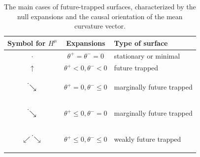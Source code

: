 \documentclass[12pt]{iopart}
\def\dotsearrow{\hspace{-4mm}\dot{\hspace{4.8mm}\searrow}}
\begin{document}
\begin{center}
\begin{table}[h]
\caption{The main cases of future-trapped surfaces, characterized by the null expansions and the causal orientation of the mean curvature vector.}
{\begin{tabular}{c|c|l}
Symbol for $H^\mu$ & Expansions & Type of surface \\
\hline
$\cdot$ & $\theta^+=\theta^-=0$ &stationary or minimal \\
\hline
$\uparrow$ & $\theta^+<0, \theta^-<0$ & future trapped\\
\hline
\begin{sideways}{$\dotsearrow$}\end{sideways} & $\theta^+=0, \theta^-\leq 0$ & marginally future trapped \\
\hline
\begin{sideways}\begin{sideways}{$\dotsearrow$}\end{sideways}\end{sideways} & $\theta^+\leq 0, \theta^-=0$ & marginally future trapped \\
\hline
\begin{sideways}\begin{sideways}$\swarrow\dotsearrow$
\end{sideways}\end{sideways}\hspace{-9.9mm} \hspace{2mm}\raisebox{2mm}{$\uparrow$} & $\theta^+\leq 0, \theta^-\leq 0$ & weakly future trapped \\
\hline
\end{tabular}\label{table:H+theta}}
\end{table}
\end{center} 
\end{document}
